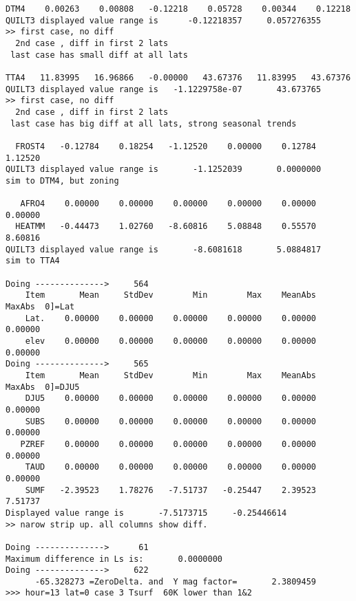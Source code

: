 \documentclass{article}
\begin{document}
\begin{verbatim}
DTM4    0.00263    0.00808   -0.12218    0.05728    0.00344    0.12218
QUILT3 displayed value range is      -0.12218357     0.057276355
>> first case, no diff
  2nd case , diff in first 2 lats 
 last case has small diff at all lats    

TTA4   11.83995   16.96866   -0.00000   43.67376   11.83995   43.67376
QUILT3 displayed value range is   -1.1229758e-07       43.673765
>> first case, no diff
  2nd case , diff in first 2 lats 
 last case has big diff at all lats, strong seasonal trends

  FROST4   -0.12784    0.18254   -1.12520    0.00000    0.12784    1.12520
QUILT3 displayed value range is       -1.1252039       0.0000000
sim to DTM4, but zoning

   AFRO4    0.00000    0.00000    0.00000    0.00000    0.00000    0.00000
  HEATMM   -0.44473    1.02760   -8.60816    5.08848    0.55570    8.60816
QUILT3 displayed value range is       -8.6081618       5.0884817
sim to TTA4

Doing -------------->     564
    Item       Mean     StdDev        Min        Max    MeanAbs     MaxAbs  0]=Lat
    Lat.    0.00000    0.00000    0.00000    0.00000    0.00000    0.00000
    elev    0.00000    0.00000    0.00000    0.00000    0.00000    0.00000
Doing -------------->     565
    Item       Mean     StdDev        Min        Max    MeanAbs     MaxAbs  0]=DJU5
    DJU5    0.00000    0.00000    0.00000    0.00000    0.00000    0.00000
    SUBS    0.00000    0.00000    0.00000    0.00000    0.00000    0.00000
   PZREF    0.00000    0.00000    0.00000    0.00000    0.00000    0.00000
    TAUD    0.00000    0.00000    0.00000    0.00000    0.00000    0.00000
    SUMF   -2.39523    1.78276   -7.51737   -0.25447    2.39523    7.51737
Displayed value range is       -7.5173715     -0.25446614
>> narow strip up. all columns show diff.

Doing -------------->      61
Maximum difference in Ls is:       0.0000000
Doing -------------->     622
      -65.328273 =ZeroDelta. and  Y mag factor=       2.3809459
>>> hour=13 lat=0 case 3 Tsurf  60K lower than 1&2


\end{verbatim}
\end{document}
